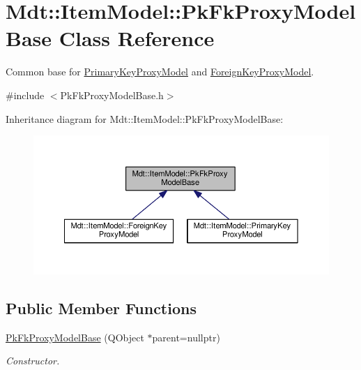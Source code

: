 \hypertarget{class_mdt_1_1_item_model_1_1_pk_fk_proxy_model_base}{}\section{Mdt\+:\+:Item\+Model\+:\+:Pk\+Fk\+Proxy\+Model\+Base Class Reference}
\label{class_mdt_1_1_item_model_1_1_pk_fk_proxy_model_base}


Common base for \hyperlink{class_mdt_1_1_item_model_1_1_primary_key_proxy_model}{Primary\+Key\+Proxy\+Model} and \hyperlink{class_mdt_1_1_item_model_1_1_foreign_key_proxy_model}{Foreign\+Key\+Proxy\+Model}.  




{\ttfamily \#include $<$Pk\+Fk\+Proxy\+Model\+Base.\+h$>$}



Inheritance diagram for Mdt\+:\+:Item\+Model\+:\+:Pk\+Fk\+Proxy\+Model\+Base\+:
\nopagebreak
\begin{figure}[H]
\begin{center}
\leavevmode
\includegraphics[width=350pt]{class_mdt_1_1_item_model_1_1_pk_fk_proxy_model_base__inherit__graph}
\end{center}
\end{figure}
\subsection*{Public Member Functions}
\begin{DoxyCompactItemize}
\item 
\hyperlink{class_mdt_1_1_item_model_1_1_pk_fk_proxy_model_base_adb72f773a5efaa240e3916bbb4613fec}{Pk\+Fk\+Proxy\+Model\+Base} (Q\+Object $\ast$parent=nullptr)\hypertarget{class_mdt_1_1_item_model_1_1_pk_fk_proxy_model_base_adb72f773a5efaa240e3916bbb4613fec}{}\label{class_mdt_1_1_item_model_1_1_pk_fk_proxy_model_base_adb72f773a5efaa240e3916bbb4613fec}

\begin{DoxyCompactList}\small\item\em Constructor. \end{DoxyCompactList}\end{DoxyCompactItemize}
